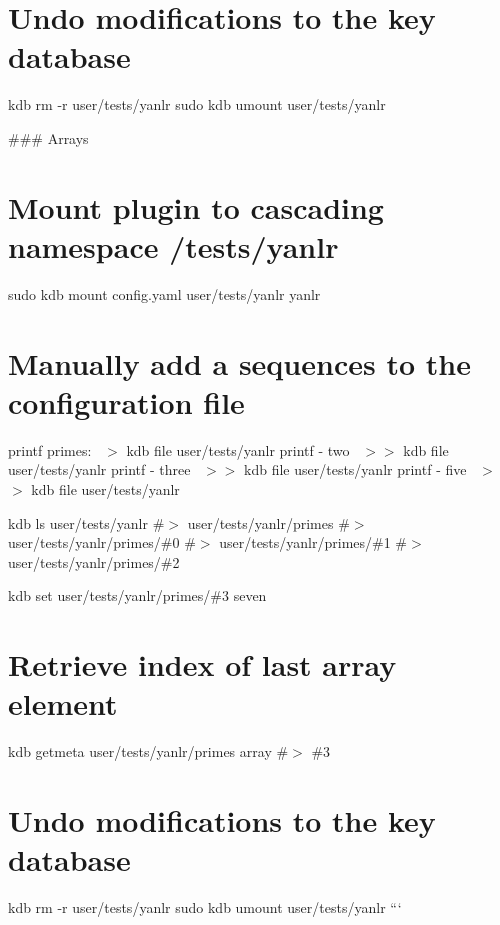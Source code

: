 \section*{Undo modifications to the key database}

kdb rm -\/r user/tests/yanlr sudo kdb umount user/tests/yanlr 
\begin{DoxyCode}
### Arrays
\end{DoxyCode}
 \section*{Mount plugin to cascading namespace {\ttfamily /tests/yanlr}}

sudo kdb mount config.\+yaml user/tests/yanlr yanlr

\section*{Manually add a sequences to the configuration file}

printf \textquotesingle{}primes\+:~\newline
\textquotesingle{} $>$ {\ttfamily kdb file user/tests/yanlr} printf \textquotesingle{} -\/ two~\newline
\textquotesingle{} $>$$>$ {\ttfamily kdb file user/tests/yanlr} printf \textquotesingle{} -\/ three~\newline
\textquotesingle{} $>$$>$ {\ttfamily kdb file user/tests/yanlr} printf \textquotesingle{} -\/ five~\newline
\textquotesingle{} $>$$>$ {\ttfamily kdb file user/tests/yanlr}

kdb ls user/tests/yanlr \#$>$ user/tests/yanlr/primes \#$>$ user/tests/yanlr/primes/\#0 \#$>$ user/tests/yanlr/primes/\#1 \#$>$ user/tests/yanlr/primes/\#2

kdb set user/tests/yanlr/primes/\#3 seven

\section*{Retrieve index of last array element}

kdb getmeta user/tests/yanlr/primes array \#$>$ \#3

\section*{Undo modifications to the key database}

kdb rm -\/r user/tests/yanlr sudo kdb umount user/tests/yanlr ```

